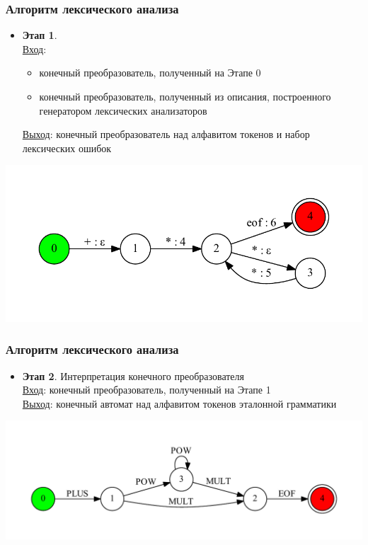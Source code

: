 \documentclass{beamer}
\begin{document}
\begin{frame}[fragile]
\transwipe[direction=90]
\frametitle{Алгоритм лексического анализа}
\begin{itemize}
\item \textbf{Этап 1}.\\
\underline{Вход}: \\ 
\begin{itemize}
\item конечный преобразователь, полученный на Этапе 0
\item конечный преобразователь, полученный из описания, построенного генератором лексических анализаторов
\end{itemize}
\underline{Выход}: конечный преобразователь над алфавитом токенов и набор лексических ошибок

\end{itemize}

\begin{center}
 \includegraphics[width=0.6\linewidth]{calc_ex_compose}
\end{center} 

\end{frame}

\begin{frame}[fragile]
\transwipe[direction=90]
\frametitle{Алгоритм лексического анализа}
\begin{itemize}
\item \textbf{Этап 2}. Интерпретация конечного преобразователя \\
\underline{Вход}: конечный преобразователь, полученный на Этапе 1 \\
\underline{Выход}: конечный автомат над алфавитом токенов эталонной грамматики \\
\end{itemize}

\begin{center}	 	
    \includegraphics[width=0.8\linewidth]{calc_ex_res}    
\end{center} 
\end{frame}
\end{document}
